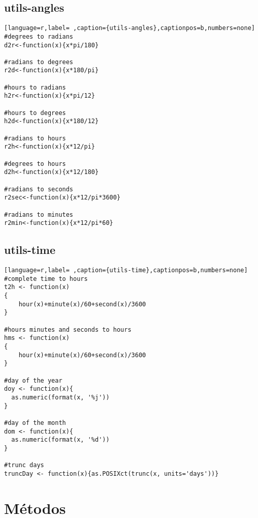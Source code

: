 \subsection{utils-angles}
\label{sec:org2e7d862}
\label{subsec:utils-angles}
\begin{lstlisting}[language=r,label= ,caption={utils-angles},captionpos=b,numbers=none]
#degrees to radians
d2r<-function(x){x*pi/180}

#radians to degrees
r2d<-function(x){x*180/pi}

#hours to radians
h2r<-function(x){x*pi/12}

#hours to degrees
h2d<-function(x){x*180/12}

#radians to hours
r2h<-function(x){x*12/pi}

#degrees to hours
d2h<-function(x){x*12/180}

#radians to seconds
r2sec<-function(x){x*12/pi*3600}

#radians to minutes
r2min<-function(x){x*12/pi*60}
\end{lstlisting}
\subsection{utils-time}
\label{sec:orgca3fd20}
\label{subsec:utils-time}
\begin{lstlisting}[language=r,label= ,caption={utils-time},captionpos=b,numbers=none]
#complete time to hours
t2h <- function(x)
{
    hour(x)+minute(x)/60+second(x)/3600
}

#hours minutes and seconds to hours
hms <- function(x)
{
    hour(x)+minute(x)/60+second(x)/3600
}

#day of the year
doy <- function(x){
  as.numeric(format(x, '%j'))
}

#day of the month
dom <- function(x){
  as.numeric(format(x, '%d'))
}

#trunc days
truncDay <- function(x){as.POSIXct(trunc(x, units='days'))}
\end{lstlisting}
\section{Métodos}
\label{sec:orgeba0b9c}
\label{sec:metodos}
